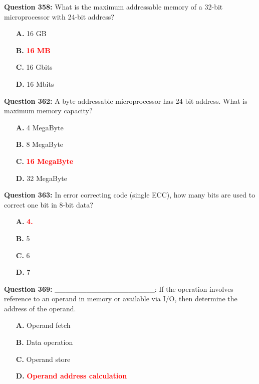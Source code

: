 \documentclass[12pt,a4paper]{article}
\begin{document}
\vspace{0.5cm}

\textbf{Question 358:} What is the maximum addressable memory of a 32-bit microprocessor with 24-bit address?

\begin{itemize}
    \item[\textbf{A.}] 16 GB
    \item[\textbf{B.}] \textcolor{red}{\textbf{16 MB}}
    \item[\textbf{C.}] 16 Gbits
    \item[\textbf{D.}] 16 Mbits
\end{itemize}

\vspace{0.5cm}

\textbf{Question 362:} A byte addressable microprocessor has 24 bit address. What is maximum memory capacity?

\begin{itemize}
    \item[\textbf{A.}] 4 MegaByte
    \item[\textbf{B.}] 8 MegaByte
    \item[\textbf{C.}] \textcolor{red}{\textbf{16 MegaByte}}
    \item[\textbf{D.}] 32 MegaByte
\end{itemize}

\vspace{0.5cm}

\textbf{Question 363:} In error correcting code (single ECC), how many bits are used to correct one bit in 8-bit data?

\begin{itemize}
    \item[\textbf{A.}] \textcolor{red}{\textbf{4.}}
    \item[\textbf{B.}] 5
    \item[\textbf{C.}] 6
    \item[\textbf{D.}] 7
\end{itemize}

\vspace{0.5cm}

\textbf{Question 369:} ___________________: If the operation involves reference to an operand in memory or available via I/O, then determine the address of the operand.

\begin{itemize}
    \item[\textbf{A.}] Operand fetch
    \item[\textbf{B.}] Data operation
    \item[\textbf{C.}] Operand store
    \item[\textbf{D.}] \textcolor{red}{\textbf{Operand address calculation}}
\end{itemize}
\end{document}
